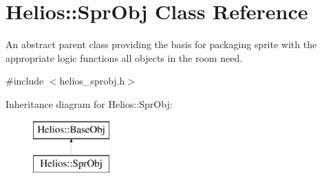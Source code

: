 \hypertarget{class_helios_1_1_spr_obj}{}\section{Helios\+:\+:Spr\+Obj Class Reference}
\label{class_helios_1_1_spr_obj}


An abstract parent class providing the basis for packaging sprite with the appropriate logic functions all objects in the room need.  




{\ttfamily \#include $<$helios\+\_\+sprobj.\+h$>$}

Inheritance diagram for Helios\+:\+:Spr\+Obj\+:\begin{figure}[H]
\begin{center}
\leavevmode
\includegraphics[height=2.000000cm]{class_helios_1_1_spr_obj}
\end{center}
\end{figure}
